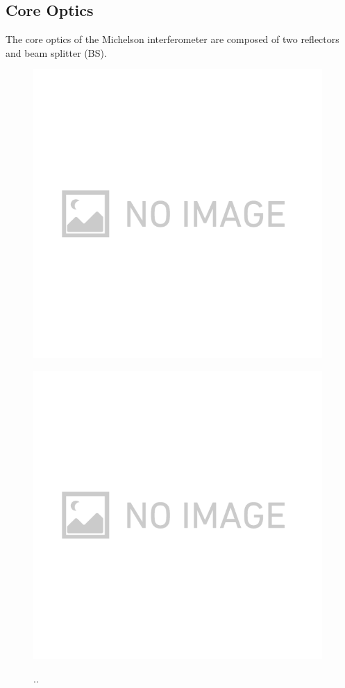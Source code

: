 \subsection{Core Optics}
The core optics of the Michelson interferometer are composed of two reflectors and beam splitter (BS). 

\begin{figure}[p]  
    \begin{center}   
      \includegraphics[width=11cm]{./img.png}
      \label{img:img418}
    \end{center}
    \begin{center}   
      \includegraphics[width=11cm]{./img.png}      
      \label{img:img419}
    \end{center}
    \caption{..}
\end{figure}


